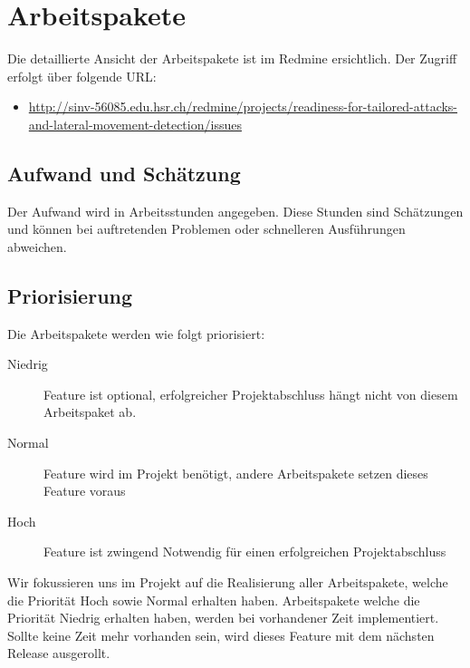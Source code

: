 \section{Arbeitspakete}
Die detaillierte Ansicht der Arbeitspakete ist im Redmine ersichtlich. Der Zugriff erfolgt über folgende URL:
\begin{itemize}
    \item \url{http://sinv-56085.edu.hsr.ch/redmine/projects/readiness-for-tailored-attacks-and-lateral-movement-detection/issues}
\end{itemize}


\subsection{Aufwand und Schätzung}
Der Aufwand wird in Arbeitsstunden angegeben. Diese Stunden sind Schätzungen und können bei auftretenden Problemen oder schnelleren Ausführungen abweichen.

\subsection{Priorisierung}
Die Arbeitspakete werden wie folgt priorisiert:
\begin{description}
    \item[Niedrig] Feature ist optional, erfolgreicher Projektabschluss hängt nicht von diesem Arbeitspaket ab.
    \item[Normal] Feature wird im Projekt benötigt, andere Arbeitspakete setzen dieses Feature voraus
    \item[Hoch] Feature ist zwingend Notwendig für einen erfolgreichen    Projektabschluss
\end{description}
Wir fokussieren uns im Projekt auf die Realisierung aller Arbeitspakete, welche die Priorität Hoch sowie Normal erhalten haben. Arbeitspakete welche die Priorität Niedrig erhalten haben, werden bei vorhandener Zeit implementiert. Sollte keine Zeit mehr vorhanden sein, wird dieses Feature mit dem nächsten Release ausgerollt.
